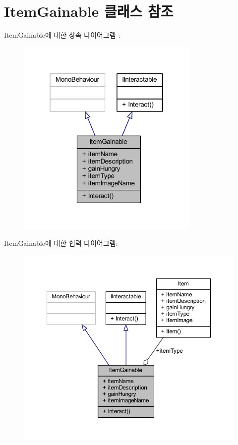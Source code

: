 \hypertarget{class_item_gainable}{}\section{Item\+Gainable 클래스 참조}
\label{class_item_gainable}


Item\+Gainable에 대한 상속 다이어그램 \+: \nopagebreak
\begin{figure}[H]
\begin{center}
\leavevmode
\includegraphics[width=250pt]{dd/d85/class_item_gainable__inherit__graph}
\end{center}
\end{figure}


Item\+Gainable에 대한 협력 다이어그램\+:\nopagebreak
\begin{figure}[H]
\begin{center}
\leavevmode
\includegraphics[width=350pt]{de/d02/class_item_gainable__coll__graph}
\end{center}
\end{figure}

